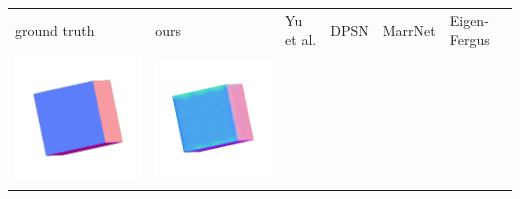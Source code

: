 \begin{center}
\begin{tabularx}{\linewidth}{@{}Y@{}Y@{}Y@{}Y@{}Y@{}Y@{}}
ground truth & ours & Yu et al. & DPSN & MarrNet & Eigen-Fergus \\
\includegraphics[width=\linewidth]{semisynthetic/20150514_0_gt.png} &
\includegraphics[width=\linewidth]{semisynthetic/20150514_0_ours_out.png} &

\end{tabularx}
\end{center}
